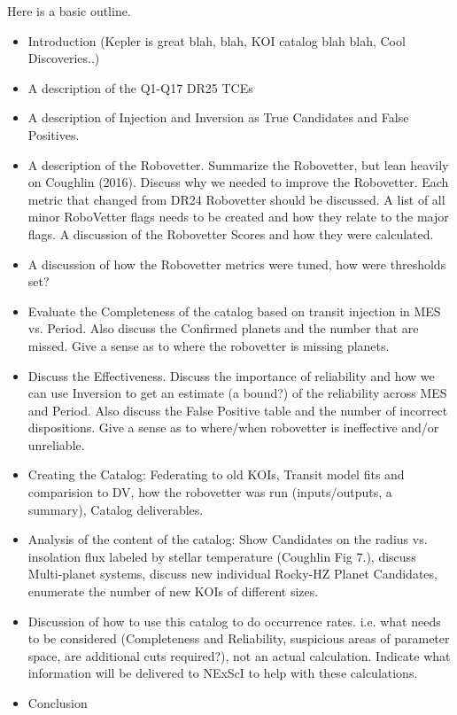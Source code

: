 \documentclass[onecolumn]{aastex6}
\begin{document}
Here is a basic outline.
\begin{itemize}
\item Introduction  (Kepler is great blah, blah, KOI catalog blah blah, Cool Discoveries..)

\item A description of the Q1-Q17 DR25 TCEs

\item A description of Injection and Inversion as True Candidates and False Positives.

\item A description of the Robovetter. Summarize the Robovetter, but lean heavily on Coughlin (2016). Discuss why we needed to improve the Robovetter.  Each metric that changed from DR24 Robovetter should be discussed. A list of all minor RoboVetter flags needs to be created and how they relate to the major flags. A discussion of the Robovetter Scores and how they were calculated.

\item A discussion of how the Robovetter metrics were tuned, how were thresholds set? 

\item Evaluate the Completeness of the catalog based on transit injection in MES vs. Period. Also discuss the Confirmed planets and the number that are missed. Give a sense as to where the robovetter is missing planets.

\item Discuss the Effectiveness. Discuss the importance of reliability and how we can use Inversion to get an estimate (a bound?) of the reliability across MES and Period. Also discuss the False Positive table and the number of incorrect dispositions.  Give a sense as to where/when robovetter is ineffective and/or unreliable.

\item Creating the Catalog: Federating to old KOIs, Transit model fits and comparision to DV, how the robovetter was run (inputs/outputs, a summary),  Catalog deliverables. 

\item Analysis of the content of the catalog: Show Candidates on the radius vs. insolation flux labeled by stellar temperature (Coughlin Fig 7.), discuss Multi-planet systems, discuss new individual Rocky-HZ Planet Candidates, enumerate the number of new KOIs of different sizes.

\item Discussion of how to use this catalog to do occurrence rates. i.e. what needs to be considered (Completeness and Reliability, suspicious areas of parameter space, are additional cuts required?), not an actual calculation. Indicate what information will be delivered to NExScI to help with these calculations. 

\item Conclusion 


\end{itemize}
\end{document}
